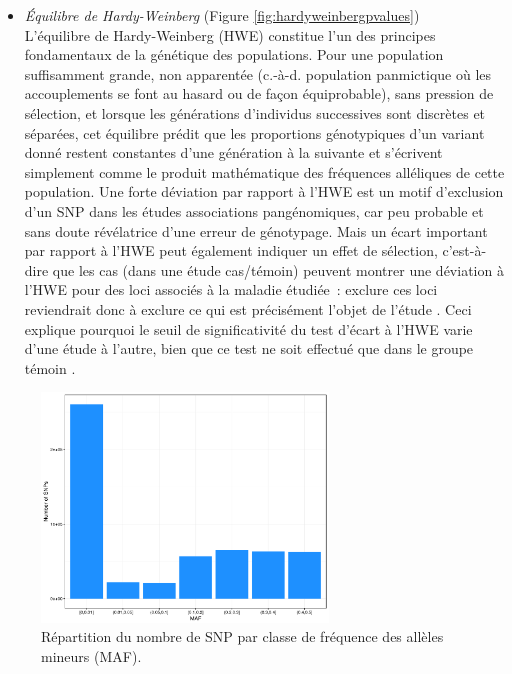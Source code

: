 \documentclass[11pt,a4paper,notrimn]{krantz}
\providecommand{\tightlist}{%
  \setlength{\itemsep}{0pt}\setlength{\parskip}{0pt}}
\theoremstyle{definition}
\theoremstyle{definition}
\theoremstyle{remark}
\begin{document}
\begin{itemize}
\tightlist
\item
  \emph{Équilibre de Hardy-Weinberg} (Figure
  \ref{fig:hardyweinbergpvalues})\\
  L'équilibre de Hardy-Weinberg (HWE) constitue l'un des principes
  fondamentaux de la génétique des populations. Pour une population
  suffisamment grande, non apparentée (c.-à-d. population panmictique où
  les accouplements se font au hasard ou de façon équiprobable), sans
  pression de sélection, et lorsque les générations d'individus
  successives sont discrètes et séparées, cet équilibre prédit que les
  proportions génotypiques d'un variant donné restent constantes d'une
  génération à la suivante et s'écrivent simplement comme le produit
  mathématique des fréquences alléliques de cette population. Une forte
  déviation par rapport à l'HWE est un motif d'exclusion d'un SNP dans
  les études associations pangénomiques, car peu probable et sans doute
  révélatrice d'une erreur de génotypage. Mais un écart important par
  rapport à l'HWE peut également indiquer un effet de sélection,
  c'est-à-dire que les cas (dans une étude cas/témoin) peuvent montrer
  une déviation à l'HWE pour des loci associés à la maladie étudiée~:
  exclure ces loci reviendrait donc à exclure ce qui est précisément
  l'objet de l'étude \citep{wittke-thompson_rational_2005}. Ceci
  explique pourquoi le seuil de significativité du test d'écart à l'HWE
  varie d'une étude à l'autre, bien que ce test ne soit effectué que
  dans le groupe témoin
  \citep{meyre_genome-wide_2009, sladek_genome-wide_2007, burton_genome-wide_2007}.
\end{itemize}




\begin{figure}[!htb]

{\centering \includegraphics[width=3in,height=2.4in]{FiguresTables/mafdistribution} 

}

\caption{Répartition du nombre de SNP par classe de
fréquence des allèles mineurs (MAF).}\label{fig:mafdistribution}
\end{figure}
\end{document}
